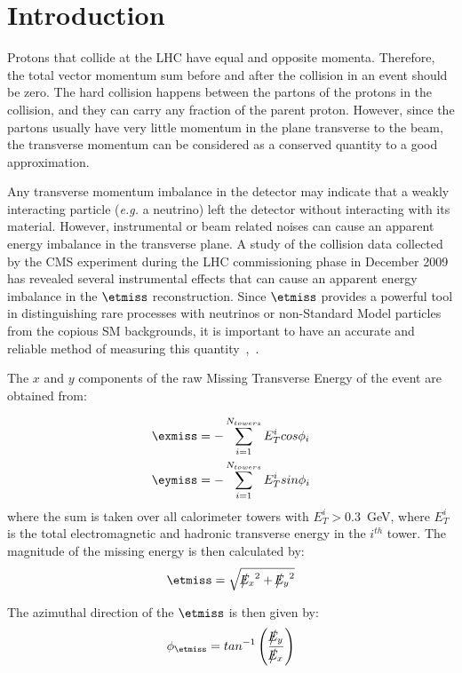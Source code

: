 \section{Introduction}
Protons that collide at the LHC have equal and
opposite momenta. Therefore, the total vector momentum sum before and
after the collision in an event
should be zero. The hard collision happens between the partons of the
protons in the collision, and they can carry any fraction of the parent
proton. However, since the partons usually have very
little momentum in the plane transverse to the beam, the transverse
momentum can be considered as a conserved quantity to a good
approximation. 

Any transverse momentum imbalance in the detector may indicate that a
weakly interacting particle (\textit{e.g.} a neutrino) left the
detector without interacting with its material. However, instrumental or
beam related noises can cause an apparent energy imbalance in the
transverse plane. A study of the collision data collected by the CMS
experiment during the LHC commissioning phase in December 2009 has
revealed several instrumental effects that can cause an apparent energy
imbalance in the $\etmiss$ reconstruction. Since $\etmiss$ provides a powerful
tool in distinguishing rare processes with neutrinos or non-Standard
Model particles from the copious SM backgrounds, it is important to have an accurate and reliable method
of measuring this quantity~\cite{CMS:AN_2007_041},~\cite{CMS:AN_2008_089}. 

The $x$ and $y$ components of the raw Missing Transverse Energy of the
event are obtained from:

\begin{align}
  \label{eq:32}
  \exmiss&=-\sum\limits^{N_{towers}}_{i=1}E_T^icos\phi_i\\
  \label{eq:33}
  \eymiss&=-\sum\limits^{N_{towers}}_{i=1}E_T^isin\phi_i
\end{align}
where the sum is taken over all calorimeter towers with $E_T^i>0.3$~GeV, 
where $E_T^i$ is the total electromagnetic and hadronic transverse energy 
in the $i^{th}$ tower. The magnitude of the missing energy is then calculated
by:
\begin{equation}
  \etmiss=\sqrt{\big\slash\hspace{-1.6ex}{E_x}^2+\big\slash\hspace{-1.6ex}{E_y}^2}
\end{equation}

The azimuthal direction of the $\etmiss$ is then given by:
\begin{equation}
  \phi_{\etmiss}=tan^{-1}\left(\frac{\big\slash\hspace{-1.6ex}{E_y}}{\big\slash\hspace{-1.6ex}{E_x}}\right)
\end{equation}

